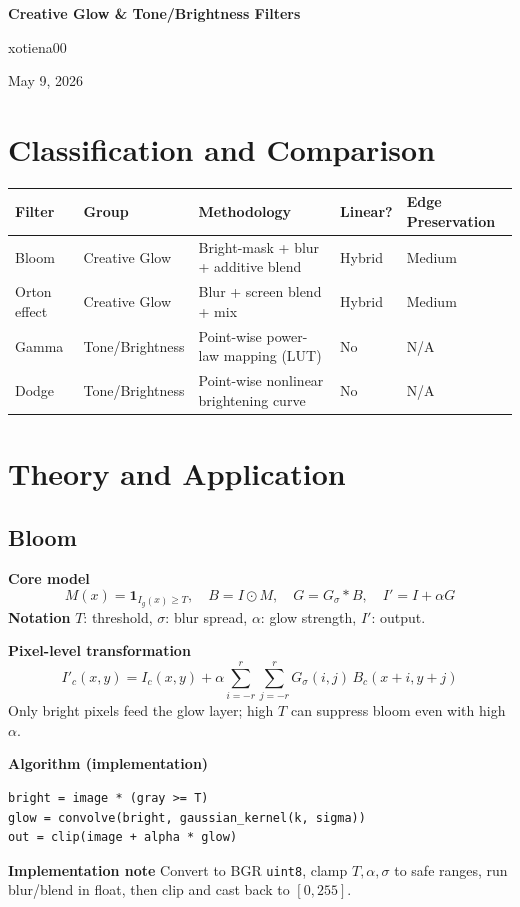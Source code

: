 \documentclass[11pt,a4paper]{article}
\begin{document}
\begin{center}
{\LARGE\bfseries Creative Glow \& Tone/Brightness Filters\par}
\vspace{2pt}
{\large xotiena00\par}
\vspace{2pt}
{May 9, 2026\par}
\end{center}
\vspace{6pt}

\section{Classification and Comparison}
\begin{center}
\begin{tabular}{@{}lllll@{}}
\toprule
\textbf{Filter} & \textbf{Group} & \textbf{Methodology} & \textbf{Linear?} & \textbf{Edge Preservation} \\
\midrule
Bloom & Creative Glow & Bright-mask + blur + additive blend & Hybrid & Medium \\
Orton effect & Creative Glow & Blur + screen blend + mix & Hybrid & Medium \\
Gamma & Tone/Brightness & Point-wise power-law mapping (LUT) & No & N/A \\
Dodge & Tone/Brightness & Point-wise nonlinear brightening curve & No & N/A \\
\bottomrule
\end{tabular}
\end{center}

\section{Theory and Application}

\subsection{Bloom}
\textbf{Core model}
\[
M(x)=\mathbf{1}_{I_g(x)\ge T},\quad B=I\odot M,\quad G=G_{\sigma}*B,\quad I'=I+\alpha G
\]
\textbf{Notation} \(T\): threshold, \(\sigma\): blur spread, \(\alpha\): glow strength, \(I'\): output.

\textbf{Pixel-level transformation}
\[
I'_c(x,y)=I_c(x,y)+\alpha\sum_{i=-r}^{r}\sum_{j=-r}^{r}G_{\sigma}(i,j)\,B_c(x+i,y+j)
\]
Only bright pixels feed the glow layer; high \(T\) can suppress bloom even with high \(\alpha\).

\textbf{Algorithm (implementation)}
\begin{lstlisting}[style=pycode]
bright = image * (gray >= T)
glow = convolve(bright, gaussian_kernel(k, sigma))
out = clip(image + alpha * glow)
\end{lstlisting}
\textbf{Implementation note} Convert to BGR \texttt{uint8}, clamp \(T,\alpha,\sigma\) to safe ranges, run blur/blend in float, then clip and cast back to \([0,255]\).
\end{document}
